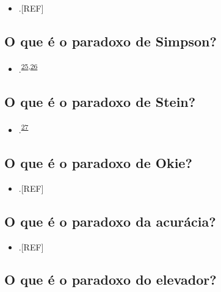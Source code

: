 \documentclass[
  a4paper,
]{book}
\providecommand{\tightlist}{%
  \setlength{\itemsep}{0pt}\setlength{\parskip}{0pt}}
\begin{document}
\begin{itemize}
\tightlist
\item
  .{[}REF{]}
\end{itemize}

\hypertarget{simpson}{%
\subsection{O que é o paradoxo de Simpson?}\label{simpson}}

\begin{itemize}
\tightlist
\item
  .\textsuperscript{\protect\hyperlink{ref-simpson1951}{25},\protect\hyperlink{ref-blyth1972}{26}}
\end{itemize}

\hypertarget{stein}{%
\subsection{O que é o paradoxo de Stein?}\label{stein}}

\begin{itemize}
\tightlist
\item
  .\textsuperscript{\protect\hyperlink{ref-stein1956}{27}}
\end{itemize}

\hypertarget{okie}{%
\subsection{O que é o paradoxo de Okie?}\label{okie}}

\begin{itemize}
\tightlist
\item
  .{[}REF{]}
\end{itemize}

\hypertarget{acuracia}{%
\subsection{O que é o paradoxo da acurácia?}\label{acuracia}}

\begin{itemize}
\tightlist
\item
  .{[}REF{]}
\end{itemize}

\hypertarget{elevador}{%
\subsection{O que é o paradoxo do elevador?}\label{elevador}}
\end{document}
